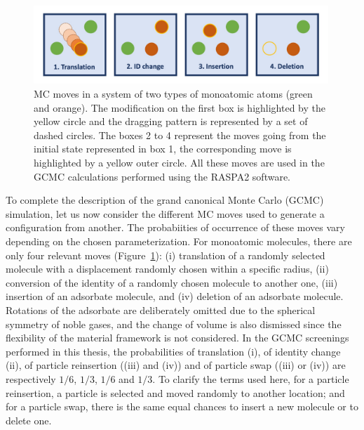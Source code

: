 \documentclass[main.tex]{subfiles}
\begin{document}
\begin{figure}[ht]
  \centering
  \includegraphics[width=0.99\textwidth]{figures/2-thermo/MC_moves.jpg}
  \caption{MC moves in a system of two types of monoatomic atoms (green and orange). The modification on the first box is highlighted by the yellow circle and the dragging pattern is represented by a set of dashed circles. The boxes 2 to 4 represent the moves going from the initial state represented in box 1, the corresponding move is highlighted by a yellow outer circle. All these moves are used in the GCMC calculations performed using the RASPA2 software. }\label{fgr:mc}
\end{figure}

To complete the description of the grand canonical Monte Carlo (GCMC) simulation, let us now consider the different MC moves used to generate a configuration from another. The probabiities of occurrence of these moves vary depending on the chosen parameterization. For monoatomic molecules, there are only four relevant moves (Figure~\ref{fgr:mc}): (i) translation of a randomly selected molecule with a displacement randomly chosen within a specific radius, (ii) conversion of the identity of a randomly chosen molecule to another one, (iii) insertion of an adsorbate molecule, and (iv) deletion of an adsorbate molecule. Rotations of the adsorbate are deliberately omitted due to the spherical symmetry of noble gases, and the change of volume is also dismissed since the flexibility of the material framework is not considered. In the GCMC screenings performed in this thesis, the probabilities of translation (i), of identity change (ii), of particle reinsertion ((iii) and (iv)) and of particle swap ((iii) or (iv)) are respectively $1/6$, $1/3$, $1/6$ and $1/3$. To clarify the terms used here, for a particle reinsertion, a particle is selected and moved randomly to another location; and for a particle swap, there is the same equal chances to insert a new molecule or to delete one. 
\end{document}
